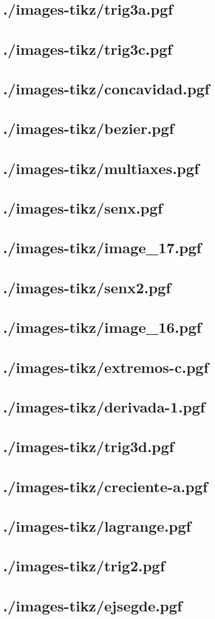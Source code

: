 \documentclass[]{article}
\begin{document}
\section{./images-tikz/trig3a.pgf} 
\section{./images-tikz/trig3c.pgf} 
\section{./images-tikz/concavidad.pgf} 
\section{./images-tikz/bezier.pgf} 
\section{./images-tikz/multiaxes.pgf} 
\section{./images-tikz/senx.pgf} 
\section{./images-tikz/image_17.pgf} 
\section{./images-tikz/senx2.pgf} 
\section{./images-tikz/image_16.pgf} 
\section{./images-tikz/extremos-c.pgf} 
\section{./images-tikz/derivada-1.pgf} 
\section{./images-tikz/trig3d.pgf} 
\section{./images-tikz/creciente-a.pgf} 
\section{./images-tikz/lagrange.pgf} 
\section{./images-tikz/trig2.pgf} 
\section{./images-tikz/ejsegde.pgf} 
\end{document}
